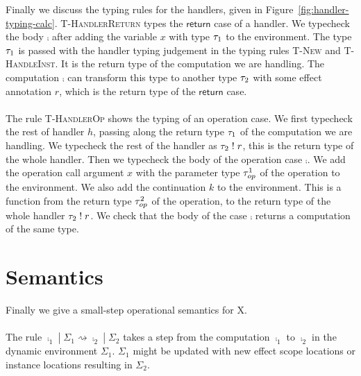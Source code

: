 {Finally we discuss the typing rules for the handlers, given in Figure~\ref{fig:handler-typing-calc}.
\textsc{T-HandlerReturn} types the $\mathsf{return}$ case of a handler.
We typecheck the body $\comp$ after adding the variable $x$ with type $\tau_1$ to the environment.
The type $\tau_1$ is passed with the handler typing judgement in the typing rules \textsc{T-New} and \textsc{T-HandleInst}.
It is the return type of the computation we are handling.
The computation $\comp$ can transform this type to another type $\tau_2$ with some effect annotation $r$, which is the return type of the $\mathsf{return}$ case.
\\\\
The rule \textsc{T-HandlerOp} shows the typing of an operation case.
We first typecheck the rest of handler $h$, passing along the return type $\tau_1$ of the computation we are handling.
We typecheck the rest of the handler as $\tau_2 \; ! \; r$, this is the return type of the whole handler.
Then we typecheck the body of the operation case $\comp$.
We add the operation call argument $x$ with the parameter type $\tau^1_{op}$ of the operation to the environment.
We also add the continuation $k$ to the environment.
This is a function from the return type $\tau^2_{op}$ of the operation, to the return type of the whole handler $\tau_2 \; ! \; r$.
We check that the body of the case $\comp$ returns a computation of the same type.

\section{Semantics}
\label{sec:semantics}

Finally we give a small-step operational semantics for X.
\\\\
The rule $\comp_1 \;|\; \Sigma_1 \rightsquigarrow \comp_2 \;|\; \Sigma_2$ takes a step from the computation $\comp_1$ to $\comp_2$ in the dynamic environment $\Sigma_1$.
$\Sigma_1$ might be updated with new effect scope locations or instance locations resulting in $\Sigma_2$.

}
